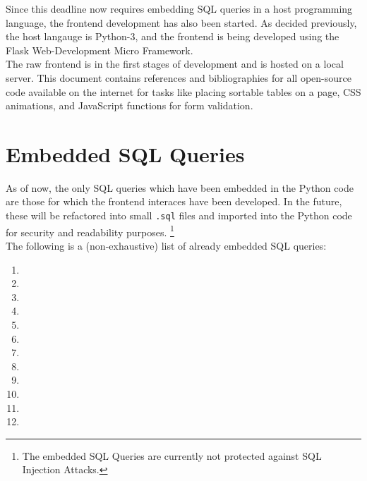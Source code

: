 \documentclass[12pt]{report}
\begin{document}
    Since this deadline now requires embedding SQL queries in a host programming language, the frontend development has also been started.
    As decided previously, the host langauge is Python-3, and the frontend is being developed using the Flask Web-Development Micro Framework. \\
    The raw frontend is in the first stages of development and is hosted on a local server.
    This document contains references and bibliographies for all open-source code available on the internet for tasks like placing sortable tables on a page,
    CSS animations, and JavaScript functions for form validation.

    \section*{\Huge Embedded SQL Queries}
    \vspace*{10pt}

    As of now, the only SQL queries which have been embedded in the Python code are those for which the frontend interaces have been developed.
    In the future, these will be refactored into small \texttt{.sql} files and imported into the Python code for security and readability purposes.
    \footnote{The embedded SQL Queries are currently not protected against SQL Injection Attacks.}
    \vspace*{10pt} \\
    The following is a (non-exhaustive) list of already embedded SQL queries:

    \begin{enumerate}
        \item 
        \item 
        \item 
        \item 
        \item 
        \item 
        \item 
        \item 
        \item 
        \item 
        \item 
        \item 
    \end{enumerate}
\end{document}
